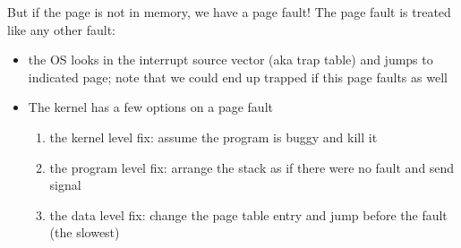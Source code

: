 \documentclass[../../lecture_notes.tex]{subfiles}
\begin{document}
\begin{center}
\end{center}

But if the page is not in memory, we have a page fault! The page fault is treated like any other fault:
\begin{itemize}
	\item the OS looks in the interrupt source vector (aka trap table) and jumps to indicated page; note that we could end up trapped if this page faults as well
	\item The kernel has a few options on a page fault
	\begin{enumerate}[nosep]
		\item the kernel level fix: assume the program is buggy and kill it
		\item the program level fix: arrange the stack as if there were no fault and send signal
		\item the data level fix: change the page table entry and jump before the fault (the slowest)
	\end{enumerate}
\end{itemize}
\end{document}
